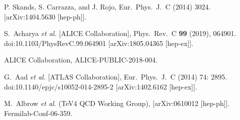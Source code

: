 \documentclass[12pt]{article}
\begin{document}
\begin{thebibliography}{1}
   P. Skands, S. Carrazza, and J. Rojo,
  Eur.\ Phys.\ J.\ C (2014) 3024.
  [arXiv:1404.5630 [hep-ph]].

  S.~Acharya {\it et al.} [ALICE Collaboration],
  Phys.\ Rev.\ C \textbf{99} (2019), 064901.
  doi:10.1103/PhysRevC.99.064901
  [arXiv:1805.04365 [hep-ex]].

  ALICE Collaboration,
  ALICE-PUBLIC-2018-004.

  G.~Aad {\it et al.} [ATLAS Collaboration],
  Eur.\ Phys.\ J.\ C (2014) 74: 2895.
  doi:10.1140/epjc/s10052-014-2895-2
  [arXiv:1402.6162 [hep-ex]].

  M.~Albrow {\it et al.} (TeV4 QCD Working Group),
  [arXiv:0610012 [hep-ph]].
  Fermilab-Conf-06-359.

  
\end{thebibliography}
  
\end{document}
